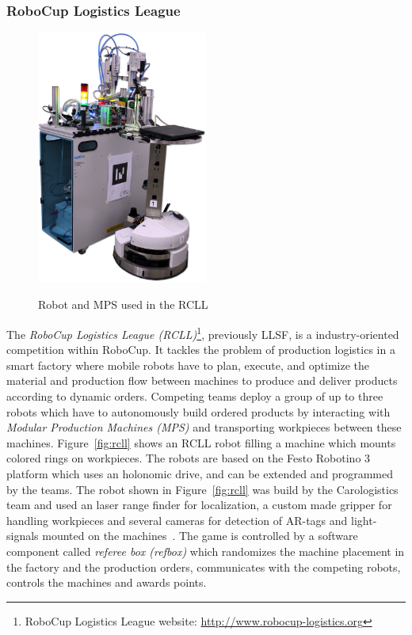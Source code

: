 \documentclass[a4paper,11pt]{article}
\newcommand{\reffig}[1]{Figure~\ref{#1}}
\begin{document}
\subsubsection{RoboCup Logistics League}
\begin{figure}
  \begin{minipage}[b]{0.5\linewidth}
    \centering
    \includegraphics[width=0.5\textwidth]{img/rcll}
    \caption{Robot and MPS used in the RCLL}
    \label{fig:rcll}
  \end{minipage}
\quad
\begin{minipage}[b]{0.5\linewidth}
  \label{fig:}
\end{minipage}
\end{figure}

%
The \emph{RoboCup Logistics League (RCLL)}\footnote{RoboCup Logistics
  League website: \url{http://www.robocup-logistics.org}}, previously
LLSF, is a industry-oriented competition within RoboCup.  It tackles
the problem of production logistics in a smart factory where mobile
robots have to plan, execute, and optimize the material and production
flow between machines to produce and deliver products according to
dynamic orders. Competing teams deploy a group of up to three robots
which have to autonomously build ordered products by interacting with
\emph{Modular Production Machines (MPS)} and transporting workpieces
between these machines.  \reffig{fig:rcll} shows an RCLL robot filling
a machine which mounts colored rings on workpieces. The robots are
based on the Festo Robotino 3 platform which uses an holonomic drive,
and can be extended and programmed by the teams. The robot shown in
\reffig{fig:rcll} was build by the Carologistics team and used an
laser range finder for localization, a custom made gripper for
handling workpieces and several cameras for detection of AR-tags and
light-signals mounted on the machines~\cite{Carologistics2015}. The
game is controlled by a software component called \emph{referee box
  (refbox)} which randomizes the machine placement in the factory and
the production orders, communicates with the competing robots,
controls the machines and awards points.
\end{document}
